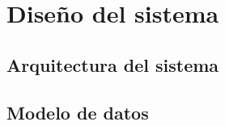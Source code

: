 \chapter{Diseño del sistema}\label{chap:diseño}
\section{Arquitectura del sistema}\label{sec:arquitectura}

\section{Modelo de datos}\label{sec:modelo}
